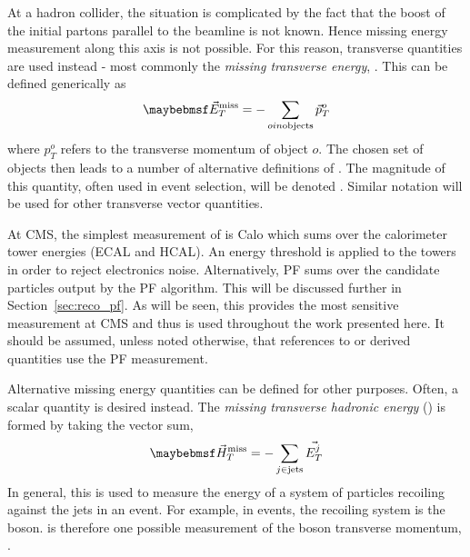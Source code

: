 At a hadron collider, the situation is complicated by the fact that the boost of
the initial partons parallel to the beamline is not known. Hence missing energy
measurement along this axis is not possible. For this reason, transverse
quantities are used instead - most commonly the \emph{missing transverse
  energy}, \METv. This can be defined generically as
\begin{equation*}
\METv = -\sum_{o in \textrm{objects}} \vec{p}_T^o
\end{equation*}
where $p_T^o$ refers to the transverse momentum of object $o$. The chosen set of
objects then leads to a number of alternative definitions of \METv. The
magnitude of this quantity, often used in event selection, will be denoted
\MET. Similar notation will be used for other transverse vector quantities.

At \ac{CMS}, the simplest measurement of \METv is \ac{Calo} \METv which sums
over the calorimeter tower energies (\ac{ECAL} and \ac{HCAL}).  An energy
threshold is applied to the towers in order to reject electronics
noise. Alternatively, \ac{PF} \METv sums over the candidate particles output by
the \ac{PF} algorithm. This will be discussed further in
Section~\ref{sec:reco_pf}. As will be seen, this provides the most sensitive
\METv measurement at \ac{CMS} and thus is used throughout the work presented
here. It should be assumed, unless noted otherwise, that references to \METv or
derived quantities use the \ac{PF} measurement.

Alternative missing energy quantities can be defined for other purposes. Often,
a scalar quantity is desired instead. The \emph{missing transverse hadronic
  energy} (\MHT) is formed by taking the vector sum,
\begin{equation}
\MHTv = -\sum_{j \in \textrm{jets}} \vec{E_T^j}
\end{equation}
In general, this is used to measure the energy of a system of particles
recoiling against the jets in an event. For example, in \Wjets events, the
recoiling system is the \PW boson. \MHTv is therefore one possible measurement
of the \PW boson transverse momentum, \PtWv.


